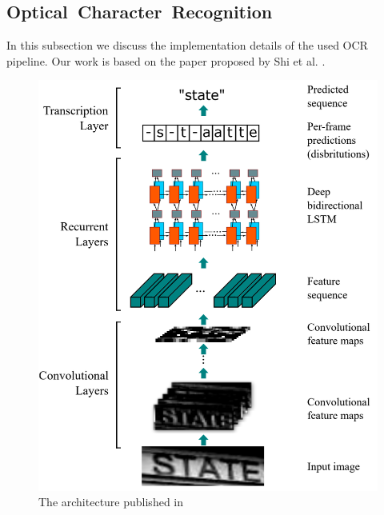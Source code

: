 \subsection{Optical~Character~Recognition}
\label{subsec:ocr}


In this subsection we discuss the implementation details of the used \ac{OCR} pipeline.
Our work is based on the paper proposed by Shi et al. \cite{7801919}.
\begin{figure}
	\includegraphics[width=\textwidth]{figures/crnn.png}
	\caption{The architecture published in \cite{7801919}}
	\label{fig:ocr_architecture}
\end{figure}








